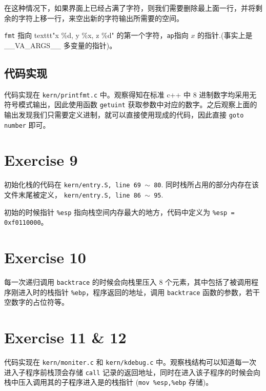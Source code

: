 \documentclass[11pt]{article}
\begin{document}
		\par 在这种情况下，如果界面上已经占满了字符，则我们需要删除最上面一行，并将剩余的字符上移一行，来空出新的字符输出所需要的空间。
		
		\par \texttt{fmt} 指向 texttt{"x \%d, y \%x, z \%d"} 的第一个字符，\texttt{ap}指向 $x$ 的指针.(事实上是 \_\_VA\_ARGS\_\_ 多变量的指针)。
	
	\subsection*{代码实现}
	
		\par 代码实现在 \texttt{kern/printfmt.c} 中。观察得知在标准 c++ 中 8 进制数字均采用无符号模式输出，因此使用函数 \texttt{getuint} 获取参数中对应的数字。之后观察上面的输出发现我们只需要定义进制，就可以直接使用现成的代码，因此直接 \texttt{goto number} 即可。
		
	\section{Exercise 9}
	
		\par 初始化栈的代码在 \texttt{kern/entry.S, line 69 $\sim$ 80}. 同时栈所占用的部分内存在该文件末尾被定义， \texttt{kern/entry.S, line 86 $\sim$ 95}.
		
		\par 初始的时候指针 \texttt{\%esp} 指向栈空间内存最大的地方，代码中定义为 \texttt{\%esp = 0xf0110000}。
		
	\section{Exercise 10}
	
		\par 每一次递归调用 \texttt{backtrace} 的时候会向栈里压入 $8$ 个元素，其中包括了被调用程序刚进入时的栈指针 \texttt{\%ebp}，程序返回的地址，调用 \texttt{backtrace} 函数的参数，若干空数字的占位符等。
		
	\section{Exercise 11 \& 12}
	
		代码实现在 \texttt{kern/moniter.c} 和 \texttt{kern/kdebug.c} 中。观察栈结构可以知道每一次进入子程序前栈顶会存储 \texttt{call} 记录的返回地址，同时在进入该子程序的时候会向栈中压入调用其的子程序进入是的栈指针 (\texttt{mov \%esp,\%ebp} 存储)。
		
\end{document}
